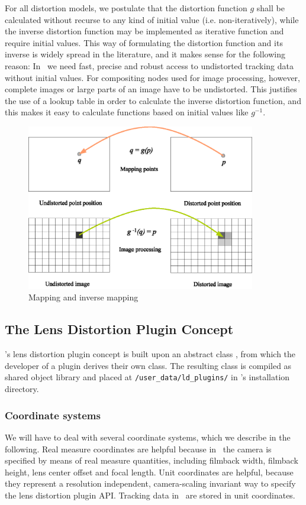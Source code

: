 \documentclass[10pt,a4paper]{article}
\begin{document}
For all distortion models, we postulate that the distortion function $g$
shall be calculated without recurse to any kind of initial value (i.e. non-iteratively),
while the inverse distortion function may be implemented as iterative function
and require initial values. This way of formulating the distortion function and its inverse
is widely spread in the literature, and it makes sense for the following reason:
In \tde\ we need fast, precise and robust access to undistorted tracking data without initial values.
For compositing nodes used for image processing, however, complete images or large parts
of an image have to be undistorted. This justifies the use of a lookup table in order to calculate
the inverse distortion function, and this makes it easy to calculate functions based on initial
values like $g^{-1}$.


\begin{figure}[ht]
\centering
\includegraphics[width=10cm]{mapping_and_inverse_mapping}
\caption{Mapping and inverse mapping}
\label{fig:MappingAndInverseMapping}
\end{figure}

\subsection{The Lens Distortion Plugin Concept}
\tde's lens distortion plugin concept is built upon
an abstract class \tdeldplugin, from which the developer
of a plugin derives their own class. The resulting
class is compiled as shared object library and placed
at {\tt /user\_data/ld\_plugins/} in \tde's installation directory.
%
\subsubsection{Coordinate systems}
We will have to deal with several coordinate systems,
which we describe in the following. Real measure coordinates
are helpful because in \tde\ the camera is specified by means
of real measure quantities, including filmback width, filmback height, lens center offset
and focal length. Unit coordinates are helpful, because they represent a resolution independent,
camera-scaling invariant way to specify the lens distortion plugin API.
Tracking data in \tde\ are stored in unit coordinates.
\end{document}
